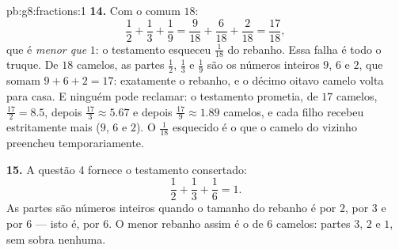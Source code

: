 \begin{solution}{pb:g8:fractions:1}
\textbf{14.} Com o  comum $18$:
\[
\frac12 + \frac13 + \frac19
= \frac{9}{18} + \frac{6}{18} + \frac{2}{18}
= \frac{17}{18} ,
\]
que é \emph{menor que} $1$: o testamento esqueceu $\frac{1}{18}$ do
rebanho. Essa falha é todo o truque. De $18$ camelos, as partes
$\frac12$, $\frac13$ e $\frac19$ são os números inteiros $9$, $6$ e
$2$, que somam $9 + 6 + 2 = 17$: exatamente o rebanho, e o décimo
oitavo camelo volta para casa. E ninguém pode reclamar: o testamento
prometia, de $17$ camelos, $\frac{17}{2} = 8.5$, depois
$\frac{17}{3} \approx 5.67$ e depois $\frac{17}{9} \approx 1.89$
camelos, e cada filho recebeu estritamente mais ($9$, $6$ e $2$). O
$\frac{1}{18}$ esquecido é o que o camelo do vizinho preencheu
temporariamente.

\textbf{15.} A questão 4 fornece o testamento consertado:
\[
\frac12 + \frac13 + \frac16 = 1 .
\]
As partes são números inteiros quando o tamanho do rebanho é 
por $2$, por $3$ e por $6$ --- isto é,  por $6$. O menor
rebanho assim é o de $6$ camelos: partes $3$, $2$ e $1$, sem sobra
nenhuma.
\end{solution}
